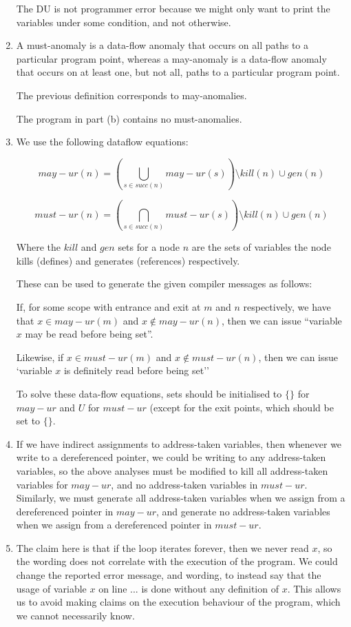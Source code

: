 \begin{enumerate}[label=(\alph*)]
The DU is not programmer error because we might only want to print the variables under some condition, and not otherwise.

\item
  A must-anomaly is a data-flow anomaly that occurs on all paths to a particular program point, whereas a may-anomaly is a data-flow anomaly that occurs on at least one, but not all, paths to a particular program point.

  The previous definition corresponds to may-anomalies.

  The program in part (b) contains no must-anomalies.

\item
  We use the following dataflow equations:

  \[
    may-ur(n) = \left(\bigcup_{s \in succ(n)} may-ur(s)\right) \setminus kill(n) \cup gen(n)
  \]

  \[
    must-ur(n) = \left(\bigcap_{s \in succ(n)} must-ur(s)\right) \setminus kill(n) \cup gen(n)
  \]

  Where the $kill$ and $gen$ sets for a node $n$ are the sets of variables the node kills (defines) and generates (references) respectively.

  These can be used to generate the given compiler messages as follows:

  If, for some scope with entrance and exit at $m$ and $n$ respectively, we have that $x \in may-ur(m)$ and $x \not \in may-ur(n)$, then we can issue ``variable $x$ may be read before being set''.

  Likewise, if $x \in must-ur(m)$ and $x \not \in must-ur(n)$, then we can issue `variable $x$ is definitely read before being set''

  To solve these data-flow equations, sets should be initialised to $\{\}$ for $may-ur$ and $U$ for $must-ur$ (except for the exit points, which should be set to $\{\}$.

\item
  If we have indirect assignments to address-taken variables, then whenever we write to a dereferenced pointer, we could be writing to any address-taken variables, so the above analyses must be modified  to kill all address-taken variables for $may-ur$, and no address-taken variables in $must-ur$. Similarly, we must generate all address-taken variables when we assign from a dereferenced pointer in $may-ur$, and generate no address-taken variables when we assign from a dereferenced pointer in $must-ur$.

\item
  The claim here is that if the loop iterates forever, then we never read $x$, so the wording does not correlate with the execution of the program. We could change the reported error message, and wording, to instead say that the usage of variable $x$ on line ... is done without any definition of $x$. This allows us to avoid making claims on the execution behaviour of the program, which we cannot necessarily know.


\end{enumerate}

